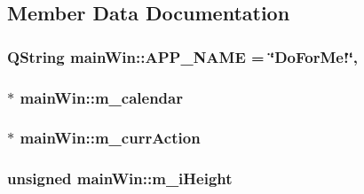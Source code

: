 \subsection{Member Data Documentation}
\hypertarget{classmain_win_a334ae495c1fd5d2063ba42801725d5ea}{
\subsubsection[{A\-P\-P\-\_\-\-N\-A\-M\-E}]{\setlength{\rightskip}{0pt plus 5cm}Q\-String main\-Win\-::\-A\-P\-P\-\_\-\-N\-A\-M\-E = \char`\"{}Do\-For\-Me!\char`\"{}\hspace{0.3cm}{\ttfamily [static]}, {\ttfamily [private]}}}\label{classmain_win_a334ae495c1fd5d2063ba42801725d5ea}
\hypertarget{classmain_win_a6a02cf853e63c1ad31759f3ce225ed62}{
\subsubsection[{m\-\_\-calendar}]{$\ast$ main\-Win\-::m\-\_\-calendar\hspace{0.3cm}{\ttfamily [private]}}}\label{classmain_win_a6a02cf853e63c1ad31759f3ce225ed62}
\hypertarget{classmain_win_ab66a39c8f78038b3cfaba29066c9fd4d}{
\subsubsection[{m\-\_\-curr\-Action}]{$\ast$ main\-Win\-::m\-\_\-curr\-Action\hspace{0.3cm}{\ttfamily [private]}}}\label{classmain_win_ab66a39c8f78038b3cfaba29066c9fd4d}
\hypertarget{classmain_win_afaa8e85eaf3926a8aa141bfc1b2c0c01}{
\subsubsection[{m\-\_\-i\-Height}]{\setlength{\rightskip}{0pt plus 5cm}unsigned main\-Win\-::m\-\_\-i\-Height\hspace{0.3cm}{\ttfamily [private]}}}\label{classmain_win_afaa8e85eaf3926a8aa141bfc1b2c0c01}
